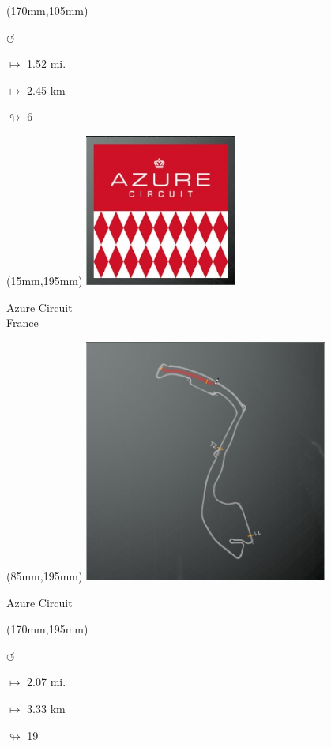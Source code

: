 \begin{textblock*}{30mm}(170mm,105mm)%
\par \Huge$\circlearrowleft$
\Large
\par$\mapsto$ 1.52 mi.
\par$\mapsto$ 2.45 km
\par$\looparrowright$ 6
\end{textblock*}
\begin{textblock*}{60mm}(15mm,195mm)%
\includegraphics[width=50mm]{LG/2015-05-20_00072.png}
\par Azure Circuit\\ France
\end{textblock*}
\begin{textblock*}{80mm}(85mm,195mm)%
\includegraphics[width=80mm]{TR/2015-05-20_00001.png}
\centerline{Azure Circuit}
\end{textblock*}
\begin{textblock*}{30mm}(170mm,195mm)%
\par \Huge$\circlearrowleft$
\Large
\par$\mapsto$ 2.07 mi.
\par$\mapsto$ 3.33 km
\par$\looparrowright$ 19
\end{textblock*}
\null\newpage

